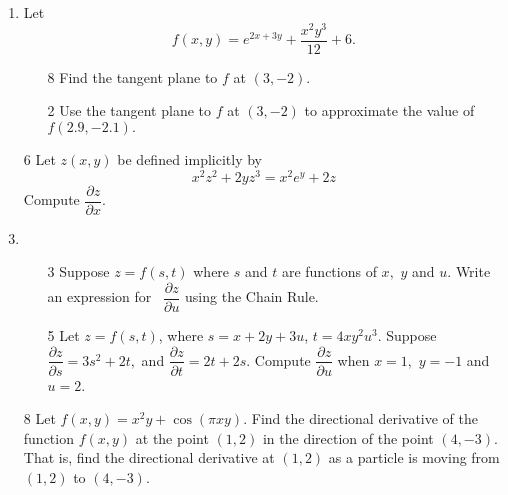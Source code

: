 \documentclass[addpoints,12pt]{exam}
\begin{document}
\begin{enumerate}
\item
Let $$f(x,y) = e^{2x+3y} + \frac{ x^2y^3}{12} +6.$$
\bigskip
\begin{itemize}
\item[8] Find the tangent plane to $f$ at $(3,-2).$
\vfill
\vfill
\item[2] Use the tangent plane to $f$ at $(3,-2)$ to approximate the value of $f(2.9, -2.1).$
\vfill
\end{itemize}
\newpage
\item[6] Let $z(x,y)$ be defined implicitly by
$$ x^2 z^2 + 2yz^3 = x^2e^y +2z$$
Compute $\dfrac{\partial z}{\partial x}. $
\newpage
\item
\begin{itemize}
\item[3]
Suppose $z=f( s, t)$ where $s $ and $t$ are functions of $x,$ $y$ and $u$. Write an
expression for \ $\dfrac{\partial z}{\partial u}$ using the Chain Rule.
\vspace{1.5in}
\item[5]
Let $z = f(s, t)$, where $s = x+2y+3u$, $t = 4xy^2u^3$. Suppose $\dfrac{\partial z}{\partial s} =
3s^2+2t,$ and $\dfrac{\partial z}{\partial t} = 2t+2s. $ Compute $\dfrac{\partial z}{\partial u}$
when $x= 1,$ $y = -1$ and $u=2$.
\vfill
\end{itemize}
\newpage
\newpage
\item[8] Let $f(x,y) = x^2y + \cos( \pi xy)$. Find the directional derivative of the function
$f(x,y)$ at the point $(1,2)$ in the direction of the point $(4,-3).$ That is, find the directional
derivative at $(1,2)$ as a particle is moving from $(1,2)$ to $(4,-3).$
\vfill
\vfill
\vfill

\end{enumerate}
\end{document}
